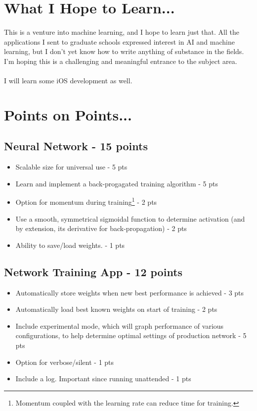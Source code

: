 \documentclass{article}
\begin{document}
\section{What I Hope to Learn...}
	\paragraph{}This is a venture into machine learning, and I hope to learn just that. All the 
	applications I sent to graduate schools expressed interest in AI and machine learning, but 
	I don’t yet know how to write anything of substance in the fields. I’m hoping this is a 
	challenging and meaningful entrance to the subject area.

	\paragraph{}I will learn some iOS development as well.

\section{Points on Points...}
	\subsection{Neural Network - 15 points}
		\begin{itemize}  pt
			\item Scalable size for universal use - 5 pts
			\item Learn and implement a back-progagated training algorithm - 5 pts
			\item Option for momentum during training\footnote{Momentum coupled with the
					learning rate can reduce time for training.} - 2 pts
			\item Use a smooth, symmetrical sigmoidal function to determine activation 
					(and by extension, its derivative for back-propagation) - 2 pts
			\item Ability to save/load weights. - 1 pts
		\end{itemize}
	\subsection{Network Training App - 12 points}
		\begin{itemize}  pt
			\item Automatically store weights when new best performance is achieved - 3 pts
			\item Automatically load best known weights on start of training - 2 pts
			\item Include experimental mode, which will graph performance of various 
					configurations, to help determine optimal settings of production network - 5 pts
			\item Option for verbose/silent - 1 pts
			\item Include a log. Important since running unattended - 1 pts
		\end{itemize}
\end{document}
